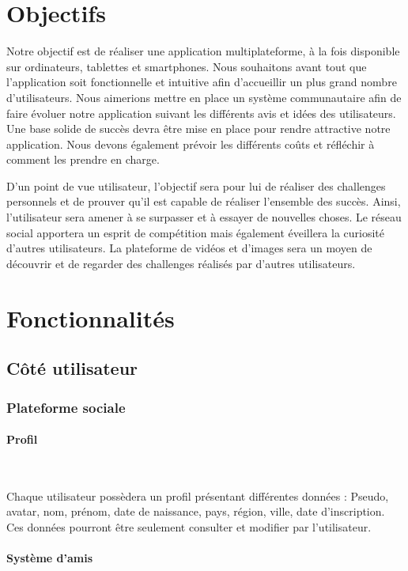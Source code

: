 \documentclass[a4paper,10pt]{article}
\begin{document}
\section{Objectifs}
Notre objectif est de réaliser une application multiplateforme, à la fois disponible sur ordinateurs, tablettes et smartphones. Nous souhaitons avant tout que l'application soit fonctionnelle et intuitive afin d'accueillir un plus grand nombre d'utilisateurs. Nous aimerions mettre en place un système communautaire afin de faire évoluer notre application suivant les différents avis et idées des utilisateurs. Une base solide de succès devra être mise en place pour rendre attractive notre application. Nous devons également prévoir les différents coûts et réfléchir à comment les prendre en charge. ~\

D'un point de vue utilisateur,  l'objectif sera pour lui de réaliser des challenges personnels et de prouver qu'il est capable de réaliser l'ensemble des succès. Ainsi, l'utilisateur sera amener à se surpasser et à essayer de nouvelles choses. Le réseau social apportera un esprit de compétition mais également éveillera la curiosité d'autres utilisateurs. La plateforme de vidéos et d'images sera un moyen de découvrir et de regarder des challenges réalisés par d'autres utilisateurs.

\section{Fonctionnalités}

\subsection{Côté utilisateur}

\subsubsection{Plateforme sociale}

\paragraph{Profil}~\

Chaque utilisateur possèdera un profil présentant différentes données : Pseudo, avatar, nom, prénom, date de naissance, pays, région, ville, date d'inscription. Ces données pourront être seulement consulter et modifier par l'utilisateur.

\paragraph{Système d'amis}~\
\end{document}
